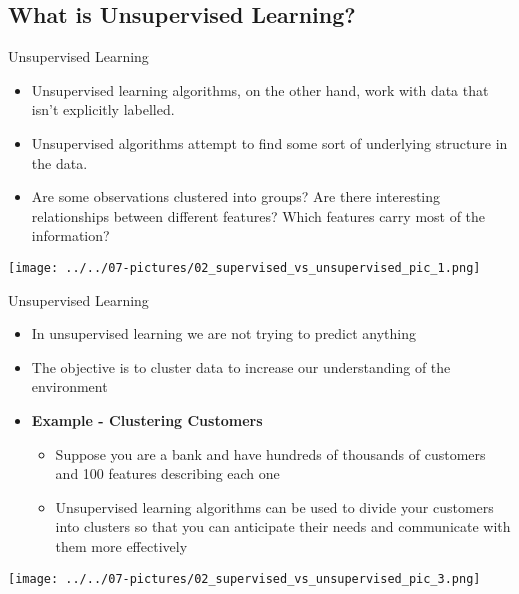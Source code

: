 \documentclass[11pt]{beamer}
\begin{document}
\subsection{What is Unsupervised Learning?}
\begin{frame}{Unsupervised Learning}
\begin{itemize}
\item Unsupervised learning algorithms, on the other hand, work with data that isn’t explicitly labelled. 

\item Unsupervised algorithms attempt to find some sort of underlying structure in the data. 

\item Are some observations clustered into groups? Are there interesting relationships between different features? Which features carry most of the information?
\end{itemize}
\begin{center}
\texttt{[image: ../../07-pictures/02\_supervised\_vs\_unsupervised\_pic\_1.png]} 
\end{center}
\end{frame}
\begin{frame}{Unsupervised Learning}
	\begin{itemize}
		\item In unsupervised learning we are not trying to predict anything
		\item The objective is to cluster data to increase our understanding of the environment
		\item \textbf{Example - Clustering Customers}
	\begin{itemize}
		\item Suppose you are a bank and have hundreds of thousands of customers and 100 features describing each one
		\item Unsupervised learning algorithms can be used to divide your customers into clusters so that you can anticipate their needs and communicate with them more effectively 
	\end{itemize}
	\end{itemize}
\begin{center}
\texttt{[image: ../../07-pictures/02\_supervised\_vs\_unsupervised\_pic\_3.png]} 
\end{center}
\end{frame}
\end{document}
